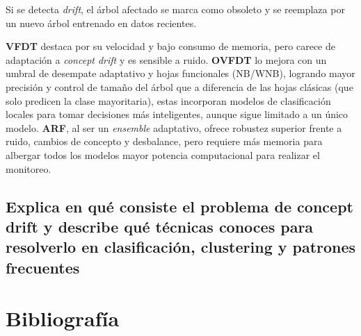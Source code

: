 \documentclass[12pt,letterpaper]{article}
\begin{document}
Si se detecta \textit{drift}, el árbol afectado se marca como obsoleto y se reemplaza por un nuevo árbol entrenado en datos recientes.

\textbf{VFDT} destaca por su velocidad y bajo consumo de memoria, pero carece de adaptación a \textit{concept drift} y es sensible a ruido. \textbf{OVFDT} lo mejora con un umbral de desempate adaptativo y hojas funcionales (NB/WNB), logrando mayor precisión y control de tamaño del árbol que a diferencia de las hojas clásicas (que solo predicen la clase mayoritaria), estas incorporan modelos de clasificación locales para tomar decisiones más inteligentes, aunque sigue limitado a un único modelo. \textbf{ARF}, al ser un \textit{ensemble} adaptativo, ofrece robustez superior frente a ruido, cambios de concepto y desbalance, pero requiere más memoria para albergar todos los modelos mayor potencia computacional para realizar el monitoreo.
\newpage

\subsection{Explica en qué consiste el problema de concept drift y describe qué técnicas conoces
    para resolverlo en clasificación, clustering y patrones frecuentes}

\newpage
\section{Bibliografía}

\printbibliography[heading=none, category=cited]
\end{document}
